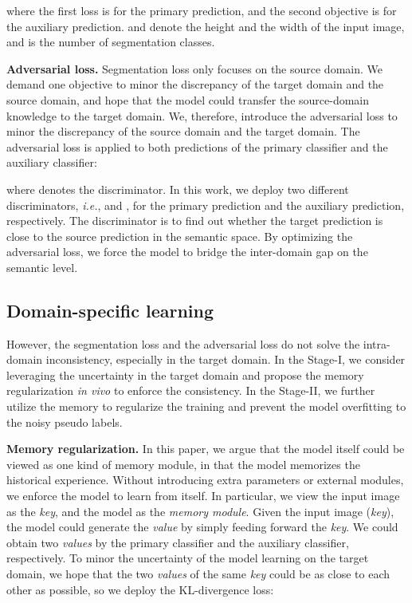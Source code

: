 \documentclass{article}
\def\ie{\emph{i.e.}}
\begin{document}
where the first loss is for the primary prediction, and the second objective is for the auxiliary prediction.  and  denote the height and the width of the input image, and  is the number of segmentation classes. 

\noindent\textbf{Adversarial loss.} Segmentation loss only focuses on the source domain. 
We demand one objective to minor the discrepancy of the target domain and the source domain, and hope that the model could transfer the source-domain knowledge to the target domain. We, therefore, introduce the adversarial loss \cite{tsai2018learning} to minor the discrepancy of the source domain and the target domain. The adversarial loss is applied to both predictions of the primary classifier and the auxiliary classifier:

where  denotes the discriminator. In this work, we deploy two different discriminators, \ie,  and , for the primary prediction and the auxiliary prediction, respectively. The discriminator is to find out whether the target prediction  is close to the source prediction  in the semantic space. By optimizing the adversarial loss, we force the model to bridge the inter-domain gap on the semantic level.
 
\subsection{Domain-specific learning}
However, the segmentation loss and the adversarial loss do not solve the intra-domain inconsistency, especially in the target domain. In the Stage-I, we consider leveraging the uncertainty in the target domain and propose the memory regularization \emph{in vivo} to enforce the consistency. In the Stage-II, we further utilize the memory to regularize the training and prevent the model overfitting to the noisy pseudo labels.

\noindent\textbf{Memory regularization.}
In this paper, we argue that the model itself could be viewed as one kind of memory module, in that the model memorizes the historical experience. Without introducing extra parameters or external modules, we enforce the model to learn from itself. In particular, we view the input image as the \emph{key}, and the model as the \emph{memory module}.
Given the input image (\emph{key}), the model could generate the \emph{value} by simply feeding forward the \emph{key}. We could obtain two \emph{values} by the primary classifier and the auxiliary classifier, respectively. To minor the uncertainty of the model learning on the target domain, we hope that the two \emph{values} of the same \emph{key} could be as close to each other as possible, so we deploy the KL-divergence loss:
\end{document}

